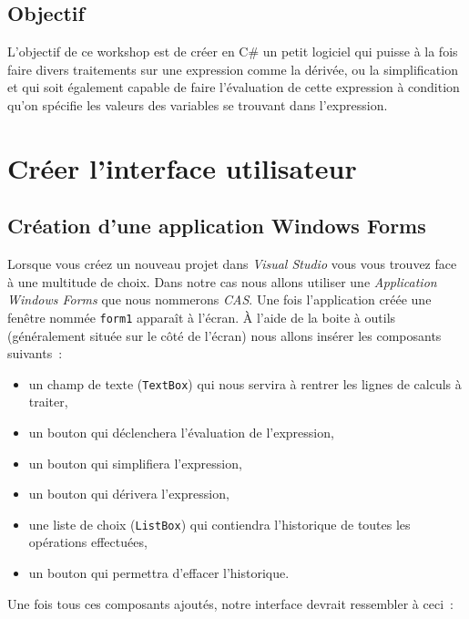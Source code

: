 \documentclass[12pt,a4paper]{report}
\begin{document}
\subsection{Objectif}

L'objectif de ce workshop est de créer en C\# un petit logiciel qui puisse à la fois faire divers traitements sur une expression comme la dérivée, ou la simplification et qui soit également capable de faire l'évaluation de cette expression à condition qu'on spécifie les valeurs des variables se trouvant dans l'expression.



\section{Créer l'interface utilisateur}

\subsection{Création d'une application Windows Forms}

Lorsque vous créez un nouveau projet dans \textit{Visual Studio} vous vous trouvez face à une multitude de choix. Dans notre cas nous allons utiliser une \textit{Application Windows Forms} que nous nommerons \textit{CAS}. Une fois l'application créée une fenêtre nommée \texttt{form1} apparaît à l'écran. À l'aide de la boite à outils (généralement située sur le côté de l'écran) nous allons insérer les composants suivants~:

\begin{itemize}
	\item un champ de texte (\texttt{TextBox}) qui nous servira à rentrer les lignes de calculs à traiter,
	\item un bouton qui déclenchera l'évaluation de l'expression,
	\item un bouton qui simplifiera l'expression,
	\item un bouton qui dérivera l'expression,
	\item une liste de choix (\texttt{ListBox}) qui contiendra l'historique de toutes les opérations effectuées,
	\item un bouton qui permettra d'effacer l'historique.
\end{itemize}
\vspace{1em}
Une fois tous ces composants ajoutés, notre interface devrait ressembler à ceci~:
\end{document}
